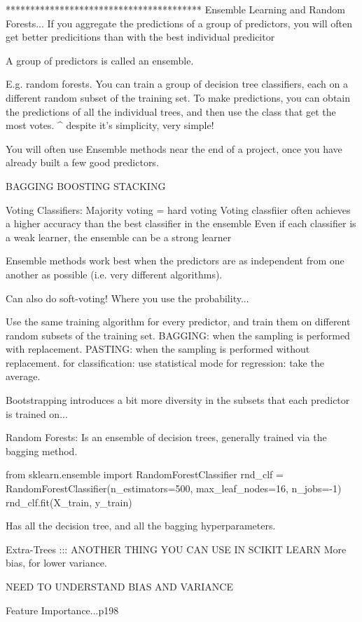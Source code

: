 ****************************************
Ensemble Learning and Random Forests...
If you aggregate the predictions of a group of predictors,
you will often get better predicitions than with the best individual predicitor

A group of predictors is called an ensemble.

E.g. random forests.
You can train a group of decision tree classifiers,
each on a different random subset of the training set.
To make predictions, you can obtain the predictions of all the individual trees,
and then use the class that get the most votes.
^ despite it's simplicity, very simple!

You will often use Ensemble methods near the end of a project,
once you have already built a few good predictors.

BAGGING
BOOSTING
STACKING

Voting Classifiers:
Majority voting = hard voting
Voting classfiier often achieves a higher accuracy than the best classifier in the ensemble
Even if each classifier is a weak learner,
the ensemble can be a strong learner

Ensemble methods work best when the predictors are
as independent from one another as possible (i.e. very different algorithms).

Can also do soft-voting! Where you use the probability...


Use the same training algorithm for every predictor,
and train them on different random subsets of the training set.
BAGGING: when the sampling is performed with replacement.
PASTING: when the sampling is performed without replacement.
for classification: use statistical mode
for regression: take the average.

Bootstrapping introduces a bit more diversity in the subsets that each predictor is trained on...

Random Forests:
Is an ensemble of decision trees, generally trained via the bagging method.

from sklearn.ensemble import RandomForestClassifier
rnd_clf = RandomForestClassifier(n_estimators=500, max_leaf_nodes=16, n_jobs=-1)
rnd_clf.fit(X_train, y_train)

Has all the decision tree, and all the bagging hyperparameters.

Extra-Trees ::: ANOTHER THING YOU CAN USE IN SCIKIT LEARN
More bias, for lower variance.

NEED TO UNDERSTAND BIAS AND VARIANCE

Feature Importance...p198

